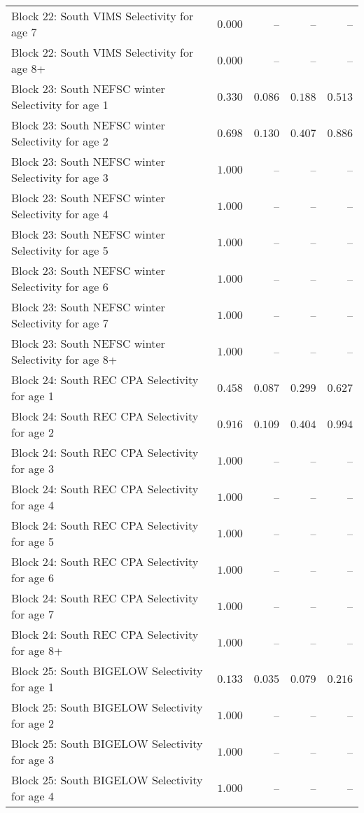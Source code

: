 \documentclass[
]{article}
\begin{document}
\begin{landscape}
\begin{longtable}[t]{lrrrr}
Block 22: South VIMS Selectivity for age 7 & $0.000$ & -- & -- & --\\
Block 22: South VIMS Selectivity for age 8+ & $0.000$ & -- & -- & --\\
Block 23: South NEFSC winter Selectivity for age 1 & $0.330$ & $0.086$ & $0.188$ & $0.513$\\
\addlinespace
Block 23: South NEFSC winter Selectivity for age 2 & $0.698$ & $0.130$ & $0.407$ & $0.886$\\
Block 23: South NEFSC winter Selectivity for age 3 & $1.000$ & -- & -- & --\\
Block 23: South NEFSC winter Selectivity for age 4 & $1.000$ & -- & -- & --\\
Block 23: South NEFSC winter Selectivity for age 5 & $1.000$ & -- & -- & --\\
Block 23: South NEFSC winter Selectivity for age 6 & $1.000$ & -- & -- & --\\
\addlinespace
Block 23: South NEFSC winter Selectivity for age 7 & $1.000$ & -- & -- & --\\
Block 23: South NEFSC winter Selectivity for age 8+ & $1.000$ & -- & -- & --\\
Block 24: South REC CPA Selectivity for age 1 & $0.458$ & $0.087$ & $0.299$ & $0.627$\\
Block 24: South REC CPA Selectivity for age 2 & $0.916$ & $0.109$ & $0.404$ & $0.994$\\
Block 24: South REC CPA Selectivity for age 3 & $1.000$ & -- & -- & --\\
\addlinespace
Block 24: South REC CPA Selectivity for age 4 & $1.000$ & -- & -- & --\\
Block 24: South REC CPA Selectivity for age 5 & $1.000$ & -- & -- & --\\
Block 24: South REC CPA Selectivity for age 6 & $1.000$ & -- & -- & --\\
Block 24: South REC CPA Selectivity for age 7 & $1.000$ & -- & -- & --\\
Block 24: South REC CPA Selectivity for age 8+ & $1.000$ & -- & -- & --\\
\addlinespace
Block 25: South BIGELOW Selectivity for age 1 & $0.133$ & $0.035$ & $0.079$ & $0.216$\\
Block 25: South BIGELOW Selectivity for age 2 & $1.000$ & -- & -- & --\\
Block 25: South BIGELOW Selectivity for age 3 & $1.000$ & -- & -- & --\\
Block 25: South BIGELOW Selectivity for age 4 & $1.000$ & -- & -- & --\\

\end{longtable}
\end{landscape}
\end{document}
